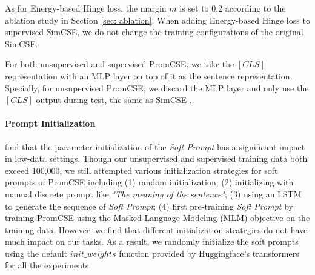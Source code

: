 \documentclass[11pt]{article}
\begin{document}
As for Energy-based Hinge loss, the margin $m$ is set to 0.2 according to the ablation study in Section \ref{sec: ablation}. When adding Energy-based Hinge loss to supervised SimCSE, we do not change the training configurations of the original SimCSE.

For both unsupervised and supervised PromCSE, we take the $[CLS]$ representation with an MLP layer on top of it as the sentence representation. Specially, for unsupervised PromCSE, we discard the MLP layer and only use the $[CLS]$ output during test, the same as SimCSE \cite{gao2021simcse}.

\paragraph{Prompt Initialization}
\cite{li2021prefix} find that the parameter initialization of the \textit{Soft Prompt} has a significant impact in low-data settings. 
Though our unsupervised and supervised training data both exceed 100,000, we still attempted various initialization strategies for soft prompts of PromCSE including (1) random initialization; (2) initializing with manual discrete prompt like \textit{"The meaning of the sentence"}; (3) using an LSTM to generate the sequence of \textit{Soft Prompt}; (4) first pre-training \textit{Soft Prompt} by training PromCSE using the Masked Language Modeling (MLM) objective on the training data. However, we find that different initialization strategies do not have much impact on our tasks. As a result, we randomly initialize the soft prompts using the default $init\_weights$ function provided by Huggingface’s transformers \cite{huggingface} for all the experiments.
\end{document}
